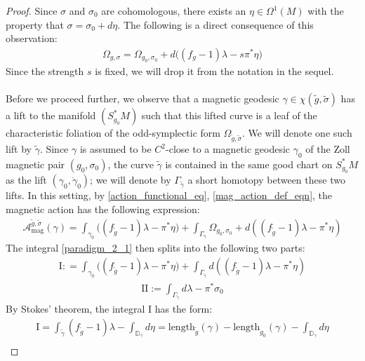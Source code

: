 \documentclass[11pt]{amsart}
\theoremstyle{plain}
\theoremstyle{definition}
\theoremstyle{remark}
\begin{document}
\begin{proof}
Since $\sigma$ and $\sigma_{0}$ are cohomologous, there exists an $\eta \in \Omega^1(M)$ with the property that $\sigma = \sigma_{0} + d\eta$. The following is a direct consequence of this observation:
\begin{align}
    \Omega_{g,\sigma} = \Omega_{g_0,\sigma_0} + d\big((f_g-1)\lambda - s\pi^*\eta\big)
\end{align}
Since the strength $s$ is fixed, we will drop it from the notation in the sequel.\\
\\
Before we proceed further, we observe that a magnetic geodesic $\gamma \in \chi(\tilde g, \tilde\sigma)$ has a lift to the manifold $(S^*_{g_0}M)$ such that this lifted curve is a leaf of the characteristic foliation of the odd-symplectic form $\Omega_{\tilde g,\tilde \sigma}$. We will denote one such lift by $\tilde \gamma$. Since $\gamma$ is assumed to be $C^2$-close to a magnetic geodesic $\gamma_0$ of the Zoll magnetic pair $(g_0,\sigma_0)$, the curve $\tilde \gamma$ is contained in the same good chart on $S^*_{g_0}M$ as the lift $(\gamma_0,\dot \gamma_0)$; we will denote by $\Gamma_{\tilde \gamma}$ a short homotopy between these two lifts. In this setting, by \eqref{action_functional_eq}, \eqref{mag_action_def_eqn}, the magnetic action has the following expression:
\begin{align}\label{paradigm_2_1}
  \mathcal{A}_{\text{mag}}^{{\tilde g,\tilde \sigma}}(\gamma)   = \int_{\gamma_{0}}\big( (f_{\tilde g}-1)\lambda - \pi^*\eta\big) + \int_{\Gamma_{\tilde \gamma}} \Omega_{g_0,\sigma_0} + d((f_{\tilde g}-1)\lambda - \pi^*\eta) 
\end{align}
The integral \eqref{paradigm_2_1} then splits into the following two parts:
\begin{align}
 \text{I}: =   \int_{\gamma_{0}} \big((f_{\tilde g}-1)\lambda - \pi^*\eta\big) + \int_{\Gamma_{\tilde\gamma}} d((f_{\tilde g}-1)\lambda - \pi^*\eta) 
\end{align}
\begin{align}
    \text{II}:=  \int_{\Gamma_{\tilde \gamma}} d\lambda - \pi^*\sigma_{0}
\end{align}
By Stokes' theorem, the integral $\text{I}$ has the form:
\begin{align}
  \text{I} = \int_{\tilde \gamma} (f_{\tilde g}-1)\lambda - \int_{\mathbb{D}_{\gamma}} d\eta =  \text{length}_{\tilde g}(\gamma) - \text{length}_{g_0}(\gamma) - \int_{\mathbb{D}_{\gamma}} d\eta \\\nonumber 

\end{align}
\end{proof}
\end{document}
